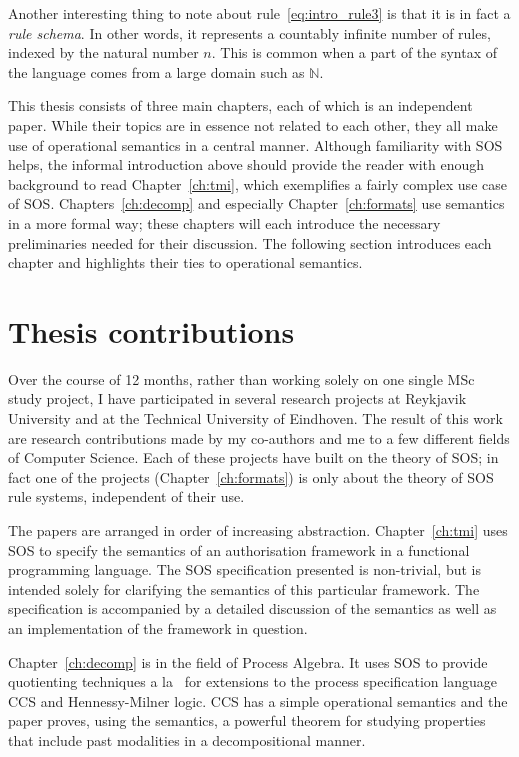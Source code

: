 Another interesting thing to note about rule~\ref{eq:intro_rule3} is that it is
in fact a \emph{rule schema}. In other words, it represents a countably infinite
number of rules, indexed by the natural number $n$. This is common when a part
of the syntax of the language comes from a large domain such as $\mathbb{N}$.

\vspace{1em}

This thesis consists of three main chapters, each of which is an independent paper.
While their topics are in essence not related to each other, they all make use of
operational semantics in a central manner. Although familiarity with SOS helps, the
informal introduction above should provide the reader with enough background to read
Chapter~\ref{ch:tmi}, which exemplifies a fairly complex use case of SOS. 
Chapters~\ref{ch:decomp} and especially Chapter~\ref{ch:formats} use semantics in a more
formal way; these chapters will each introduce the necessary preliminaries needed
for their discussion. The following section introduces each chapter and highlights
their ties to operational semantics.


\section{Thesis contributions} %

Over the course of 12 months, rather than working solely on one single MSc study project,
I have participated in several research projects at
Reykjavik University and at the Technical University of Eindhoven. The result of this work
are research contributions made by my co-authors and me to a few different fields
of Computer Science. Each of these projects have built on the theory of SOS; in fact
one of the projects (Chapter~\ref{ch:formats}) is only about the theory of SOS rule
systems, independent of their use.

The papers are arranged in order of increasing abstraction. Chapter~\ref{ch:tmi} uses SOS
to specify the semantics of an authorisation framework in a functional programming language.
The SOS specification presented is non-trivial, but is intended solely for clarifying
the semantics of this particular framework. The specification is accompanied by a
detailed discussion of the semantics as well as an implementation of the framework
in question.

Chapter~\ref{ch:decomp} is in the field of Process Algebra. It 
uses SOS to provide quotienting techniques a la~\cite{Larsen91} for extensions
to the process specification language CCS and Hennessy-Milner logic. CCS has a simple
operational semantics and the paper proves, using the semantics, a powerful theorem
for studying properties that include past modalities in a decompositional manner.

